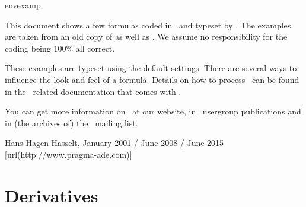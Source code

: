
%
%

\environment envexamp

\startbuffer[colofon]

This document shows a few formulas coded in \MATHML\ and typeset by \CONTEXT. The
examples are taken from an old copy of 
as well as . We assume no
responsibility for the coding being 100\% all correct.

These examples are typeset using the default settings. There are several ways to
influence the look and feel of a formula. Details on how to process \MATHML\ can
be found in the \XML\ related documentation that comes with \CONTEXT.

You can get more information on \CONTEXT\ at our website, in \TEX\ usergroup
publications and in (the archives of) the \CONTEXT\ mailing list.

\blank[2*big]

\startlines
Hans Hagen
Hasselt, January 2001 / June 2008 / June 2015
[url(http://www.pragma-ade.com)]
\stoplines

\stopbuffer

\startdocument
  [color=darkred,
   columns=2,
   title=MathML in \ConTeXt]

\section{Derivatives}

